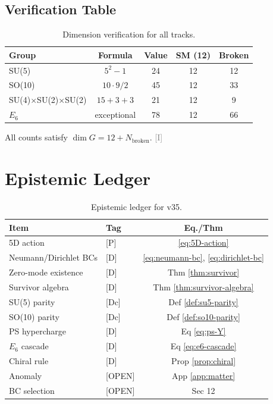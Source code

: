 \documentclass[11pt,a4paper]{article}
\newcommand{\tagD}{\textcolor{blue!70!black}{[D]}}
\newcommand{\tagDc}{\textcolor{blue!50!black}{[Dc]}}
\newcommand{\tagP}{\textcolor{green!50!black}{[P]}}
\newcommand{\tagI}{\textcolor{gray}{[I]}}
\newcommand{\tagOPEN}{\textcolor{red!70!black}{[OPEN]}}
\begin{document}
\subsection{Verification Table}

\begin{table}[h]
\centering
\begin{tabular}{lcccc}
\toprule
Group & Formula & Value & SM (12) & Broken \\
\midrule
SU(5) & $5^2-1$ & 24 & 12 & 12 \\
SO(10) & $10 \cdot 9/2$ & 45 & 12 & 33 \\
SU(4)$\times$SU(2)$\times$SU(2) & $15+3+3$ & 21 & 12 & 9 \\
$E_6$ & exceptional & 78 & 12 & 66 \\
\bottomrule
\end{tabular}
\caption{Dimension verification for all tracks.}
\label{tab:dim}
\end{table}

All counts satisfy $\dim G = 12 + N_{\text{broken}}$. \tagI

\section{Epistemic Ledger}
\label{app:ledger}

\begin{table}[h]
\centering
\begin{tabular}{llc}
\toprule
Item & Tag & Eq./Thm \\
\midrule
5D action & \tagP & \eqref{eq:5D-action} \\
Neumann/Dirichlet BCs & \tagD & \eqref{eq:neumann-bc}, \eqref{eq:dirichlet-bc} \\
Zero-mode existence & \tagD & Thm \ref{thm:survivor} \\
Survivor algebra & \tagD & Thm \ref{thm:survivor-algebra} \\
SU(5) parity & \tagDc & Def \ref{def:su5-parity} \\
SO(10) parity & \tagDc & Def \ref{def:so10-parity} \\
PS hypercharge & \tagD & Eq \eqref{eq:ps-Y} \\
$E_6$ cascade & \tagD & Eq \eqref{eq:e6-cascade} \\
Chiral rule & \tagD & Prop \ref{prop:chiral} \\
Anomaly & \tagOPEN & App \ref{app:matter} \\
BC selection & \tagOPEN & Sec 12 \\
\bottomrule
\end{tabular}
\caption{Epistemic ledger for v35.}
\label{tab:ledger}
\end{table}
\end{document}
